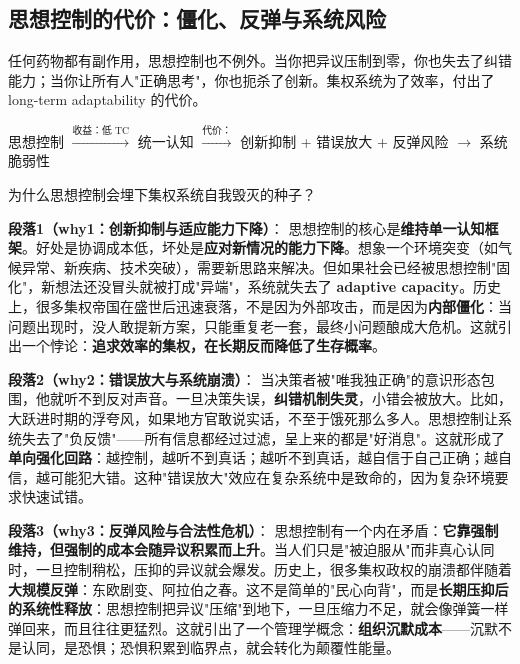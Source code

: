 \documentclass[../main.tex]{subfiles}
\begin{document}
	\subsection{思想控制的代价：僵化、反弹与系统风险}
	
	\begin{motivation}
				任何药物都有副作用，思想控制也不例外。当你把异议压制到零，你也失去了纠错能力；当你让所有人"正确思考"，你也扼杀了创新。集权系统为了效率，付出了 
		long-term adaptability 的代价。
	\end{motivation}
	
	\begin{logicmap}
		思想控制 $\xrightarrow{\text{收益：低 TC}}$ 统一认知 $\xrightarrow{\text{代价：}}$ 创新抑制 + 错误放大 + 反弹风险 $\rightarrow$ 系统脆弱性
	\end{logicmap}
	
	\begin{questionbox}
		为什么思想控制会埋下集权系统自我毁灭的种子？
	\end{questionbox}
	
	\textbf{段落1（why1：创新抑制与适应能力下降）}：  
	思想控制的核心是\textbf{维持单一认知框架}。好处是协调成本低，坏处是\textbf{应对新情况的能力下降}。想象一个环境突变（如气候异常、新疾病、技术突破），需要新思路来解决。但如果社会已经被思想控制"固化"，新想法还没冒头就被打成"异端"，系统就失去了 \textbf{adaptive capacity}。历史上，很多集权帝国在盛世后迅速衰落，不是因为外部攻击，而是因为\textbf{内部僵化}：当问题出现时，没人敢提新方案，只能重复老一套，最终小问题酿成大危机。这就引出一个悖论：\textbf{追求效率的集权，在长期反而降低了生存概率}。
	
	\textbf{段落2（why2：错误放大与系统崩溃）}：  
	当决策者被"唯我独正确"的意识形态包围，他就听不到反对声音。一旦决策失误，\textbf{纠错机制失灵}，小错会被放大。比如，大跃进时期的浮夸风，如果地方官敢说实话，不至于饿死那么多人。思想控制让系统失去了"负反馈"——所有信息都经过过滤，呈上来的都是"好消息"。这就形成了\textbf{单向强化回路}：越控制，越听不到真话；越听不到真话，越自信于自己正确；越自信，越可能犯大错。这种"错误放大"效应在复杂系统中是致命的，因为复杂环境要求快速试错。
	
	\textbf{段落3（why3：反弹风险与合法性危机）}：  
	思想控制有一个内在矛盾：\textbf{它靠强制维持，但强制的成本会随异议积累而上升}。当人们只是"被迫服从"而非真心认同时，一旦控制稍松，压抑的异议就会爆发。历史上，很多集权政权的崩溃都伴随着\textbf{大规模反弹}：东欧剧变、阿拉伯之春。这不是简单的"民心向背"，而是\textbf{长期压抑后的系统性释放}：思想控制把异议"压缩"到地下，一旦压缩力不足，就会像弹簧一样弹回来，而且往往更猛烈。这就引出了一个管理学概念：\textbf{组织沉默成本}——沉默不是认同，是恐惧；恐惧积累到临界点，就会转化为颠覆性能量。
	
\end{document}
